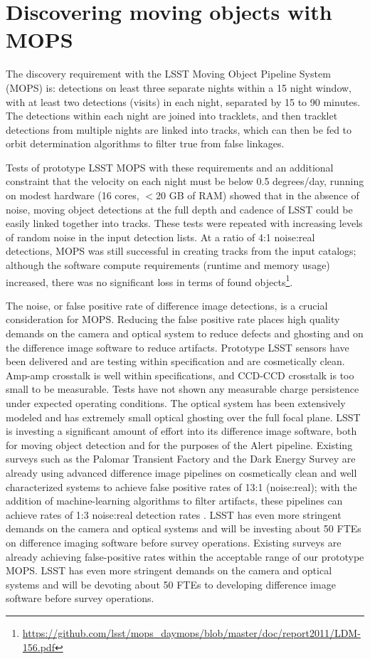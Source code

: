 \documentclass{iau}
\begin{document}
\section{Discovering moving objects with MOPS}

The discovery requirement with the LSST Moving Object Pipeline System
(MOPS) is: detections on least three separate nights within a 15 night
window, with at least two detections (visits) in each night, separated
by 15 to 90 minutes. The detections within each night are joined into
tracklets, and then tracklet detections from multiple nights are
linked into tracks, which can then be fed to orbit determination
algorithms to filter true from false linkages.

Tests of prototype LSST MOPS with these requirements and an additional
constraint that the velocity on each night must be below 0.5
degrees/day, running on modest hardware (16 cores, $<20$ GB of RAM)
showed that in the absence of noise, moving object detections at the
full depth and cadence of LSST could be easily linked together into
tracks. These tests were repeated with increasing levels of random
noise in the input detection lists. At a ratio of 4:1 noise:real
detections, MOPS was still successful in creating tracks from the
input catalogs; although the software compute requirements (runtime
and memory usage) increased, there was no significant loss in terms of
found
objects\footnote{\url{https://github.com/lsst/mops_daymops/blob/master/doc/report2011/LDM-156.pdf}}.

The noise, or false positive rate of difference image detections, is a
crucial consideration for MOPS. Reducing the false positive rate
places high quality demands on the camera and optical system to reduce
defects and ghosting and on the difference image software to reduce
artifacts. Prototype LSST sensors have been delivered and are testing
within specification and are cosmetically clean. Amp-amp crosstalk is
well within specifications, and CCD-CCD crosstalk is too small to be
measurable. Tests have not shown any measurable charge persistence
under expected operating conditions. The optical system has been
extensively modeled and has extremely small optical ghosting over the
full focal plane. LSST is investing a significant amount of effort
into its difference image software, both for moving object detection
and for the purposes of the Alert pipeline. Existing surveys such as
the Palomar Transient Factory and the Dark Energy Survey are already
using advanced difference image pipelines on cosmetically clean and
well characterized systems to achieve false positive rates of 13:1
(noise:real); with the addition of machine-learning algorithms to
filter artifacts, these pipelines can achieve rates of 1:3 noise:real
detection rates \cite{goldstein}. LSST has even
more stringent demands on the camera and optical systems and will be
investing about 50 FTEs on difference imaging software before survey
operations.  Existing surveys are already achieving false-positive
rates within the acceptable range of our prototype MOPS. LSST has
even more stringent demands on the camera and optical systems and will
be devoting about 50 FTEs to developing difference image software
before survey operations.
\end{document}
